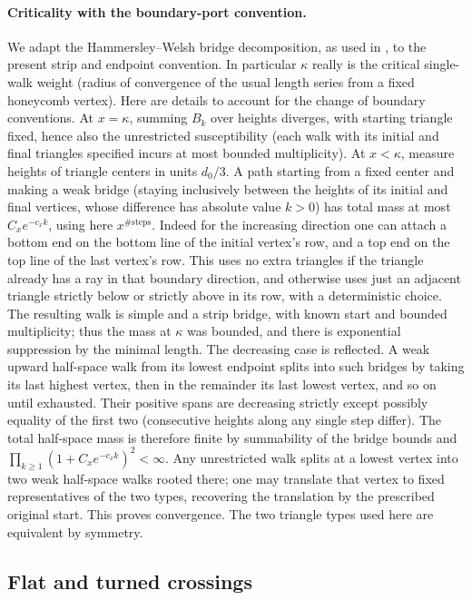 \paragraph{Criticality with the boundary-port convention.}
We adapt the Hammersley--Welsh bridge decomposition, as used in \cite[Section~3]{DuminilCopinSmirnov2012}, to the present strip and endpoint convention. In particular \(\kappa\) really is the critical single-walk weight (radius of convergence of the usual length series from a fixed honeycomb vertex). Here are details to account for the change of boundary conventions. At \(x=\kappa\), summing \(B_k\) over heights diverges, with starting triangle fixed, hence also the unrestricted susceptibility (each walk with its initial and final triangles specified incurs at most bounded multiplicity). At \(x<\kappa\), measure heights of triangle centers in units \(d_0/3\). A path starting from a fixed center and making a weak bridge (staying inclusively between the heights of its initial and final vertices, whose difference has absolute value \(k>0\)) has total mass at most \(C_x e^{-c_x k}\), using here \(x^{\#\text{steps}}\). Indeed for the increasing direction one can attach a bottom end on the bottom line of the initial vertex's row, and a top end on the top line of the last vertex's row. This uses no extra triangles if the triangle already has a ray in that boundary direction, and otherwise uses just an adjacent triangle strictly below or strictly above in its row, with a deterministic choice. The resulting walk is simple and a strip bridge, with known start and bounded multiplicity; thus the mass at \(\kappa\) was bounded, and there is exponential suppression by the minimal length. The decreasing case is reflected. A weak upward half-space walk from its lowest endpoint splits into such bridges by taking its last highest vertex, then in the remainder its last lowest vertex, and so on until exhausted. Their positive spans are decreasing strictly except possibly equality of the first two (consecutive heights along any single step differ). The total half-space mass is therefore finite by summability of the bridge bounds and \(\prod_{k\ge1}(1+C_xe^{-c_xk})^2<\infty\). Any unrestricted walk splits at a lowest vertex into two weak half-space walks rooted there; one may translate that vertex to fixed representatives of the two types, recovering the translation by the prescribed original start. This proves convergence. The two triangle types used here are equivalent by symmetry.

\subsection{Flat and turned crossings}\label{c6:subheading-11}

